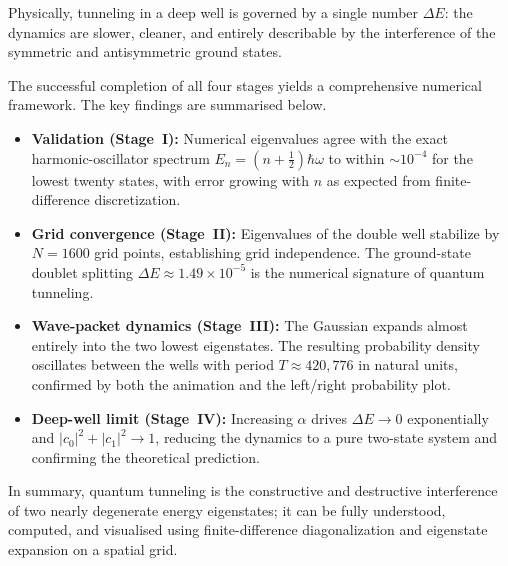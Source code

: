 \documentclass[11pt,a4paper]{article}
\begin{document}
Physically, tunneling in a deep well is governed by a single number $\Delta E$: the dynamics are slower, cleaner, and entirely describable by the interference of the symmetric and antisymmetric ground states.

The successful completion of all four stages yields a comprehensive numerical framework. The key findings are summarised below.

\begin{itemize}
    \item \textbf{Validation (Stage~I):} Numerical eigenvalues agree with the exact harmonic-oscillator spectrum $E_n=(n+\tfrac{1}{2})\hbar\omega$ to within $\sim10^{-4}$ for the lowest twenty states, with error growing with $n$ as expected from finite-difference discretization.
    \item \textbf{Grid convergence (Stage~II):} Eigenvalues of the double well stabilize by $N=1600$ grid points, establishing grid independence. The ground-state doublet splitting $\Delta E\approx1.49\times10^{-5}$ is the numerical signature of quantum tunneling.
    \item \textbf{Wave-packet dynamics (Stage~III):} The Gaussian expands almost entirely into the two lowest eigenstates. The resulting probability density oscillates between the wells with period $T\approx420{,}776$ in natural units, confirmed by both the animation and the left/right probability plot.
    \item \textbf{Deep-well limit (Stage~IV):} Increasing $\alpha$ drives $\Delta E\to 0$ exponentially and $|c_0|^2+|c_1|^2\to1$, reducing the dynamics to a pure two-state system and confirming the theoretical prediction.
\end{itemize}

\noindent In summary, quantum tunneling is the constructive and destructive interference of two nearly degenerate energy eigenstates; it can be fully understood, computed, and visualised using finite-difference diagonalization and eigenstate expansion on a spatial grid.
\end{document}
